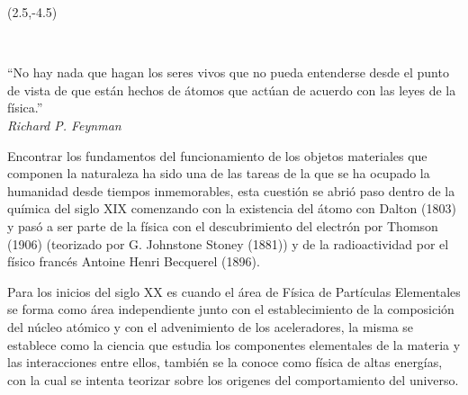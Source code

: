 \begin{textblock}{9}(2.5,-4.5)
\begin{flushright}
\setlength{\baselineskip}{15pt}
~

``No hay nada que hagan los seres vivos que no pueda entenderse desde el punto de vista de que están hechos de átomos que actúan de acuerdo con las leyes de la física.''\\[.5cm]
\textit{Richard P. Feynman}
\end{flushright}
\end{textblock}



Encontrar los fundamentos del funcionamiento de los objetos materiales que componen la naturaleza ha sido una de las tareas de la que se ha ocupado la humanidad desde tiempos inmemorables, esta cuestión se abrió paso dentro de la química del siglo XIX comenzando con la existencia del átomo con Dalton (1803) y pasó a ser parte de la física con el descubrimiento del electrón por Thomson (1906) (teorizado por G. Johnstone Stoney (1881)) y de la radioactividad por el físico francés Antoine Henri Becquerel (1896).

Para los inicios del siglo XX es cuando el área de Física de Partículas Elementales se forma como área independiente junto con el establecimiento de la composición del núcleo atómico y con el advenimiento de los aceleradores, la misma se establece como la ciencia que estudia los componentes elementales de la materia y las interacciones entre ellos, también se la conoce como física de altas energías, con la cual se intenta teorizar sobre los origenes del comportamiento del universo. 






















